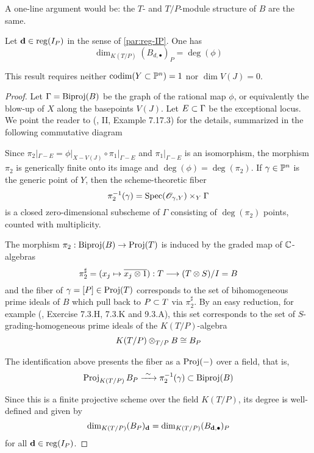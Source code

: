 \documentclass[fleqn,reqno]{amsart}
\begin{document}
\begin{remarkhint}
A one-line argument would be: the $T$- and $T/P$-module structure of $B$ are the same.
\end{remarkhint}

\begin{lemma}
\label{lemma:lengthRees}
Let $\mathbf d\in \operatorname{reg}(I_P)$ in the sense of \eqref{par:reg-IP}. One has
\[
	\dim_{K(T/P)} (B_{d,\bullet})_P=\deg(\phi)
\]
\end{lemma}

\begin{remarkhint}
This result requires neither $\operatorname{codim}(Y\subset\mathbb{P}^n)=1$ nor $\dim V(J)=0$.
\end{remarkhint}

\begin{proof}
Let $\Gamma=\operatorname{Biproj}(B)$ be the graph of the rational map $\phi$, or equivalently
the blow-up of $X$ along the basepoints $V(J)$. Let $E\subset\Gamma$ be the exceptional
locus.
We point the reader to (\citet{Har77}, II, Example 7.17.3) for the details,
summarized in the following commutative diagram


Since $\pi_2|_{\Gamma-E}=\phi|_{X-V(J)}\circ\pi_1|_{\Gamma-E}$ and
$\pi_1|_{\Gamma-E}$ is an isomorphism,
the morphism $\pi_2$ is generically finite onto its image and $\deg(\phi)=\deg(\pi_2)$.
If $\gamma\in\mathbb{P}^n$ is the generic point of $Y$, then the scheme-theoretic fiber
\[
	\pi_2^{-1}(\gamma)=\operatorname{Spec}(\mathscr{O}_{\gamma,Y})\times_Y \Gamma
\]
is a closed zero-dimensional subscheme of $\Gamma$ consisting of
$\deg(\pi_2)$ points, counted with multiplicity.

The morphism $\pi_2:\operatorname{Biproj}(B)\to\operatorname{Proj}(T)$ is induced by the graded map of $\mathbb{C}$-algebras
\[
	\pi_2^\sharp=(x_j\mapsto \overline{x_j\otimes1}):T\longrightarrow{(T\otimes S)}/{I}=B
\]
and the fiber of $\gamma=[P]\in\operatorname{Proj} (T)$ corresponds to the set of
bihomogeneous prime ideals of $B$
which pull back to $P\subset T$ via $\pi_2^\sharp$.
By an easy reduction,
for example (\citet{Vak10}, Exercise 7.3.H, 7.3.K and 9.3.A),
this set corresponds to the set of $S$-grading-homogeneous prime ideals of the $K(T/P)$-algebra
\[
	K(T/P)\otimes_{T/P}B\cong B_P
\]

The identification above presents the fiber as a $\operatorname{Proj}(-)$ over a field,
that is,
\[
	\operatorname{Proj}_{K(T/P)} B_P\xrightarrow{~\sim~}\pi_2^{-1}(\gamma)\subset\operatorname{Biproj}(B)
\]

Since this is a finite projective scheme over the field $K(T/P)$,
its degree is well-defined and given by
\[
	\dim_{K(T/P)} (B_P)_\mathbf d=\dim_{K(T/P)} (B_{\mathbf d,\bullet})_P
\]
for all $\mathbf d\in\operatorname{reg}(I_P)$.
\end{proof}
\end{document}
